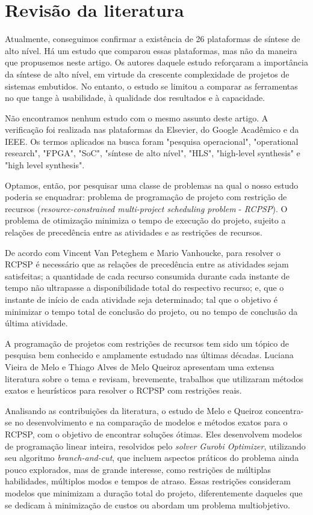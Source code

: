 \documentclass[journal]{IEEEtran}
\begin{document}
    \section{Revisão da literatura}
        Atualmente, conseguimos confirmar a existência de 26 plataformas de síntese de alto nível\cite{Wikipedia}. Há um estudo que comparou essas plataformas\cite{Meeus}, mas não da maneira que propusemos neste artigo. Os autores daquele estudo reforçaram a importância da síntese de alto nível, em virtude da crescente complexidade de projetos de sistemas embutidos. No entanto, o estudo se limitou a comparar as ferramentas no que tange à usabilidade, à qualidade dos resultados e à capacidade.

        Não encontramos nenhum estudo com o mesmo assunto deste artigo. A verificação foi realizada nas plataformas da Elsevier, do Google Acadêmico e da IEEE. Os termos aplicados na busca foram "pesquisa operacional", "operational research", "FPGA", "SoC", "síntese de alto nível", "HLS", "high-level synthesis" e "high level synthesis".

        Optamos, então, por pesquisar uma classe de problemas na qual o nosso estudo poderia se enquadrar: problema de programação de projeto com restrição de recursos (\textit{resource-constrained multi-project scheduling problem} - \textit{RCPSP}). O problema de otimização minimiza o tempo de execução do projeto, sujeito a relações de precedência entre as atividades e as restrições de recursos.
        
        De acordo com Vincent Van Peteghem e Mario Vanhoucke\cite{VANPETEGHEM201462}, para resolver o RCPSP é necessário que as relações de precedência entre as atividades sejam satisfeitas; a quantidade de cada recurso consumida durante cada instante de tempo não ultrapasse a disponibilidade total do respectivo recurso; e, que o instante de início de cada atividade seja determinado; tal que o objetivo é minimizar o tempo total de conclusão do projeto, ou no tempo de conclusão da última atividade.
        
        A programação de projetos com restrições de recursos tem sido um tópico de pesquisa bem conhecido e amplamente estudado nas últimas décadas. Luciana Vieira de Melo e Thiago Alves de Melo Queiroz\cite{LucianaThiago} apresentam uma extensa literatura sobre o tema e revisam, brevemente, trabalhos que utilizaram métodos exatos e heurísticos para resolver o RCPSP com restrições reais.

        Analisando as contribuições da literatura, o estudo de Melo e Queiroz concentra-se no desenvolvimento e na comparação de modelos e métodos exatos para o RCPSP, com o objetivo de encontrar soluções ótimas. Eles desenvolvem modelos de programação linear inteira, resolvidos pelo \textit{solver Gurobi Optimizer}, utilizando seu algoritmo \textit{branch-and-cut}, que incluem aspectos práticos do problema ainda pouco explorados, mas de grande interesse, como restrições de múltiplas habilidades, múltiplos modos e tempos de atraso. Essas restrições consideram modelos que minimizam a duração total do projeto, diferentemente daqueles que se dedicam à minimização de custos ou abordam um problema multiobjetivo.
        
\end{document}
